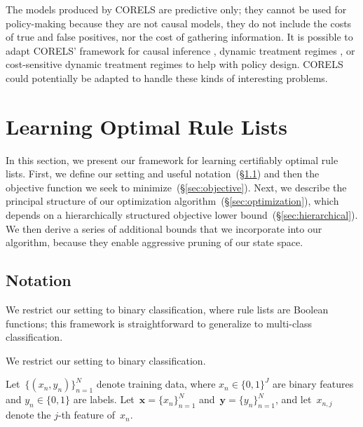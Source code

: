 \documentclass[twoside,11pt]{article}
\newcommand{\x}{\mathbf{x}}
\newcommand{\y}{\mathbf{y}}
\begin{document}
The models produced by CORELS are predictive only; they cannot be used for policy-making because they are not causal models, they do not include the costs of true and false positives, nor the cost of gathering information. It is possible to adapt CORELS' framework for causal inference \citep{WangRu15CFRL}, dynamic treatment regimes \citep{ZhangEtAl15}, or cost-sensitive dynamic treatment regimes \citep{LakkarajuRu17} to help with policy design.  CORELS could potentially be adapted to handle these kinds of interesting problems.

\section{Learning Optimal Rule Lists}
\label{sec:framework}

\begin{arxiv}
In this section, we present our framework for learning certifiably optimal rule lists.
%
First, we define our setting and useful notation~(\S\ref{sec:setup})
and then the objective function we seek to minimize~(\S\ref{sec:objective}).
%
Next, we describe the principal structure of our optimization algorithm~(\S\ref{sec:optimization}), which depends on a hierarchically
structured objective lower bound~(\S\ref{sec:hierarchical}).
%
We then derive a series of additional bounds that we incorporate into our
algorithm, because they enable aggressive pruning of our state space.
\end{arxiv}

\subsection{Notation}
\label{sec:setup}

\begin{arxiv}
We restrict our setting to binary classification,
where rule lists are Boolean functions;
this framework is straightforward to generalize to multi-class classification.
\end{arxiv}
\begin{kdd}
We restrict our setting to binary classification.
\end{kdd}
%
Let~${\{(x_n, y_n)\}_{n=1}^N}$ denote training data,
where ${x_n \in \{0, 1\}^J}$ are binary features and ${y_n \in \{0, 1\}}$ are labels.
%
Let~${\x = \{x_n\}_{n=1}^N}$ and~${\y = \{y_n\}_{n=1}^N}$,
and let~${x_{n,j}}$ denote the $j$-th feature of~$x_n$.
\end{document}
